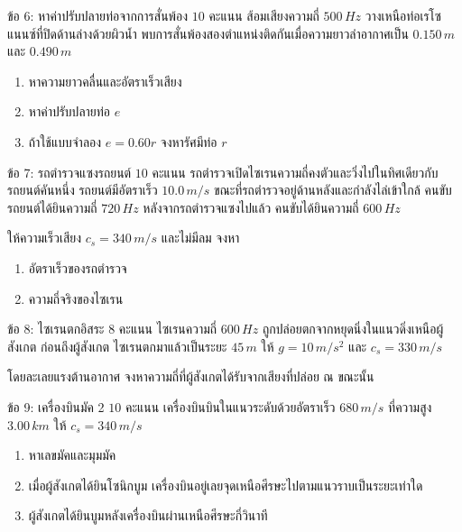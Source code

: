\begin{exercisebox}{ข้อ 6: หาค่าปรับปลายท่อจากการสั่นพ้อง $10$ คะแนน}
ส้อมเสียงความถี่ $500\,\si{Hz}$ วางเหนือท่อเรโซแนนซ์ที่ปิดด้านล่างด้วยผิวน้ำ พบการสั่นพ้องสองตำแหน่งติดกันเมื่อความยาวลำอากาศเป็น $0.150\,\si{m}$ และ $0.490\,\si{m}$

\begin{enumerate}[label=(\alph*)]
    \item หาความยาวคลื่นและอัตราเร็วเสียง
    \item หาค่าปรับปลายท่อ $e$
    \item ถ้าใช้แบบจำลอง $e=0.60r$ จงหารัศมีท่อ $r$
\end{enumerate}
\end{exercisebox}

\begin{exercisebox}{ข้อ 7: รถตำรวจแซงรถยนต์ $10$ คะแนน}
รถตำรวจเปิดไซเรนความถี่คงตัวและวิ่งไปในทิศเดียวกับรถยนต์คันหนึ่ง รถยนต์มีอัตราเร็ว $10.0\,\si{m/s}$ ขณะที่รถตำรวจอยู่ด้านหลังและกำลังไล่เข้าใกล้ คนขับรถยนต์ได้ยินความถี่ $720\,\si{Hz}$ หลังจากรถตำรวจแซงไปแล้ว คนขับได้ยินความถี่ $600\,\si{Hz}$

ให้ความเร็วเสียง $c_s=340\,\si{m/s}$ และไม่มีลม จงหา

\begin{enumerate}[label=(\alph*)]
    \item อัตราเร็วของรถตำรวจ
    \item ความถี่จริงของไซเรน
\end{enumerate}
\end{exercisebox}

\begin{exercisebox}{ข้อ 8: ไซเรนตกอิสระ $8$ คะแนน}
ไซเรนความถี่ $600\,\si{Hz}$ ถูกปล่อยตกจากหยุดนิ่งในแนวดิ่งเหนือผู้สังเกต ก่อนถึงผู้สังเกต ไซเรนตกมาแล้วเป็นระยะ $45\,\si{m}$ ให้ $g=10\,\si{m/s^2}$ และ $c_s=330\,\si{m/s}$

โดยละเลยแรงต้านอากาศ จงหาความถี่ที่ผู้สังเกตได้รับจากเสียงที่ปล่อย ณ ขณะนั้น
\end{exercisebox}

\begin{exercisebox}{ข้อ 9: เครื่องบินมัค 2 $10$ คะแนน}
เครื่องบินบินในแนวระดับด้วยอัตราเร็ว $680\,\si{m/s}$ ที่ความสูง $3.00\,\si{km}$ ให้ $c_s=340\,\si{m/s}$

\begin{enumerate}[label=(\alph*)]
    \item หาเลขมัคและมุมมัค
    \item เมื่อผู้สังเกตได้ยินโซนิกบูม เครื่องบินอยู่เลยจุดเหนือศีรษะไปตามแนวราบเป็นระยะเท่าใด
    \item ผู้สังเกตได้ยินบูมหลังเครื่องบินผ่านเหนือศีรษะกี่วินาที
\end{enumerate}
\end{exercisebox}

